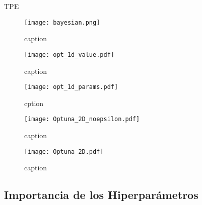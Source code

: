  
 TPE \cite{NIPS2011_86e8f7ab}
 

 
 
\begin{figure}[h!]
\centering
\texttt{[image: bayesian.png]}
\caption{caption \cite{Feurer2019} }
\label{fig:bayesian}
\end{figure}



\begin{figure}[h!]
\centering
\texttt{[image: opt\_1d\_value.pdf]}
\caption{caption }
\label{fig:optuna_1_value}
\end{figure}

  

\begin{figure}[h!]
\centering
\texttt{[image: opt\_1d\_params.pdf]}
\caption{cption }
\label{fig:optuna_1_params}
\end{figure}



\begin{figure}[p!]
\centering
\texttt{[image: Optuna\_2D\_noepsilon.pdf]}
\caption{caption }
\label{fig:optuna_2d}
\end{figure}

\begin{figure}[p!]
\centering
\texttt{[image: Optuna\_2D.pdf]}
\caption{caption }
\label{fig:optuna_2d}
\end{figure}



\subsection{Importancia de los Hiperparámetros}